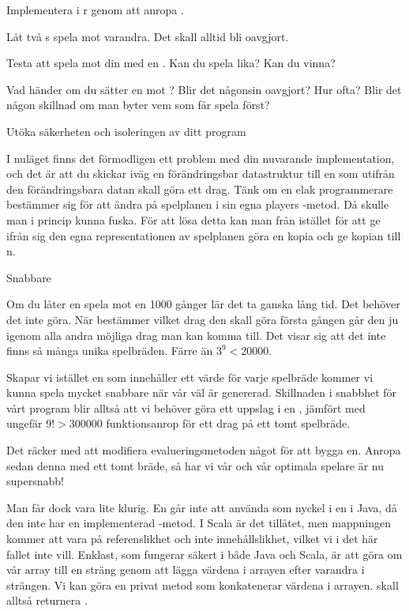 \Subtask Implementera  i r genom att anropa .

\Subtask Låt två s spela mot varandra. Det skall alltid bli oavgjort.

\Subtask Testa att spela mot din  med en . Kan du spela lika? Kan du vinna?

\Subtask Vad händer om du sätter en  mot ? Blir det någonsin oavgjort? Hur ofta? Blir det någon skillnad om man byter vem som får spela först?

\Task Utöka säkerheten och isoleringen av ditt program

I nuläget finns det förmodligen ett problem med din nuvarande implementation, och det är att du skickar iväg en förändringsbar datastruktur till en  som utifrån den förändringsbara datan skall göra ett drag. Tänk om en elak programmerare bestämmer sig för att ändra på spelplanen i sin egna players -metod. Då skulle man i princip kunna fuska. För att lösa detta kan man från  istället för att ge ifrån sig den egna representationen av spelplanen göra en kopia och ge kopian till n.

\Task Snabbare 

Om du låter en  spela mot en  1000 gånger lär det ta ganska lång tid. Det behöver det inte göra. När  bestämmer vilket drag den skall göra första gången går den ju igenom alla andra möjliga drag man kan komma till. Det visar sig att det inte finns så många unika spelbräden. Färre än $3^9 < 20000$.

Skapar vi istället en  som innehåller ett värde för varje spelbräde kommer vi kunna spela mycket snabbare när vår  väl är genererad. Skillnaden i snabbhet för vårt program blir alltså att vi behöver göra ett uppslag i en , jämfört med ungefär $9! > 300000$ funktionsanrop för ett drag på ett tomt spelbräde.

Det räcker med att modifiera evalueringsmetoden något för att bygga en. Anropa sedan denna med ett tomt bräde, så har vi vår  och vår optimala spelare är nu supersnabb!

Man får dock vara lite klurig. En  går inte att använda som nyckel i en  i Java, då den inte har en implementerad -metod. I Scala är det tillåtet, men mappningen kommer att vara på referenslikhet och inte innehållslikhet, vilket vi i det här fallet inte vill. Enklast, som fungerar säkert i både Java och Scala, är att göra om vår array till en sträng genom att lägga värdena i arrayen efter varandra i strängen. Vi kan göra en privat metod  som konkatenerar värdena i arrayen.  skall alltså returnera .

